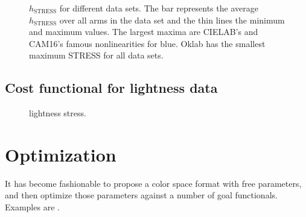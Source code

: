 \documentclass{scrartcl}
\theoremstyle{named}
\begin{document}
\begin{figure}
  \centering
  
  \caption{$h_\text{STRESS}$ for different data sets. The bar represents the average
  $h_\text{STRESS}$ over all arms in the data set and the thin lines the minimum and
  maximum values.
  The largest maxima are CIELAB's and CAM16's famous nonlinearities for blue.
  Oklab has the smallest maximum STRESS for all data sets.}
\end{figure}

\subsection{Cost functional for lightness data}

\cite{fairchildchen}

\begin{figure}
  \centering
  
  \caption{lightness stress.}
\end{figure}


\section{Optimization}

It has become fashionable to propose a color space format with free parameters, and then
optimize those parameters against a number of goal functionals. Examples are
\cite{prolab,oklab,jzazbz}.


{}

\end{document}
